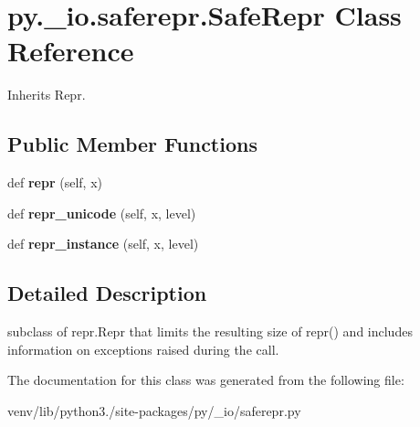 \hypertarget{classpy_1_1__io_1_1saferepr_1_1_safe_repr}{}\section{py.\+\_\+io.\+saferepr.\+Safe\+Repr Class Reference}
\label{classpy_1_1__io_1_1saferepr_1_1_safe_repr}


Inherits Repr.

\subsection*{Public Member Functions}
\begin{DoxyCompactItemize}
\item 
\mbox{\label{classpy_1_1__io_1_1saferepr_1_1_safe_repr_a521e1deb4d0b7c1f231b3d6eded29b66}} 
def {\bfseries repr} (self, x)
\item 
\mbox{\label{classpy_1_1__io_1_1saferepr_1_1_safe_repr_aa552789fbb1809145419373263113093}} 
def {\bfseries repr\+\_\+unicode} (self, x, level)
\item 
\mbox{\label{classpy_1_1__io_1_1saferepr_1_1_safe_repr_a296b2f154b90f4c0420e14947f6d6d47}} 
def {\bfseries repr\+\_\+instance} (self, x, level)
\end{DoxyCompactItemize}


\subsection{Detailed Description}
\begin{DoxyVerb}subclass of repr.Repr that limits the resulting size of repr()
    and includes information on exceptions raised during the call.
\end{DoxyVerb}
 

The documentation for this class was generated from the following file\+:\begin{DoxyCompactItemize}
\item 
venv/lib/python3./site-\/packages/py/\+\_\+io/saferepr.\+py\end{DoxyCompactItemize}
